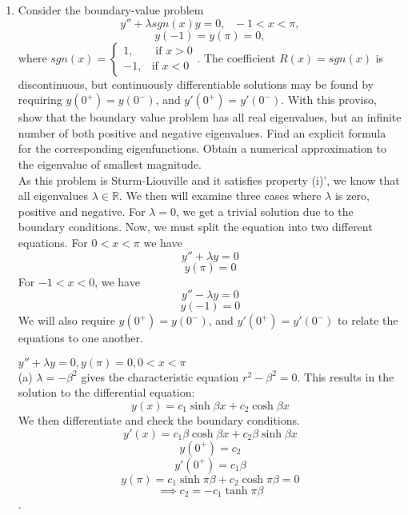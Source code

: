 \documentclass[12pt]{article}
\numberwithin{equation}{section}
\newenvironment{proof}[1][Proof]{\textbf{#1.} }{\ \rule{0.5em}{0.5em}}
\begin{document}
\begin{enumerate}
\begin{enumerate}
\begin{proof}
            $$\lambda\int R(x)|y|^2dx>0\implies \int R(x)|y|^2dx\neq 0.$$
            However, this also implies that
            $$i\lambda_2\int R(x)|y|^2dx=0\iff \lambda_2=0.$$
            We assert that this must be true, as there are no other complex terms in the sum to cancel out with this one.
            \end{proof}
        \item Consider the boundary-value problem
            $$y''+\lambda sgn(x)y=0,\text{  }-1<x<\pi,$$
            $$y(-1)=y(\pi)=0,$$
            where $sgn(x)=\left\{\begin{array}{cc}1,&\text{ if }x>0\\-1,&\text{if }x<0\end{array}\right.$. The coefficient $R(x)=sgn(x)$ is discontinuous, but continuously differentiable solutions may be found by requiring $y(0^+)=y(0^-)$, and $y'(0^+)=y'(0^-)$. With this proviso, show that the boundary value problem has all real eigenvalues, but an infinite number of both positive and negative eigenvalues. Find an explicit formula for the corresponding eigenfunctions. Obtain a numerical approximation to the eigenvalue of smallest magnitude.\\

            As this problem is Sturm-Liouville and it satisfies property (i)', we know that all eigenvalues $\lambda\in\mathbb{R}$. We then will examine three cases where $\lambda$ is zero, positive and negative. For $\lambda =0$, we get a trivial solution due to the boundary conditions. Now, we must split the equation into two different equations. For $0<x<\pi$ we have
            $$y''+\lambda y=0$$
            $$y(\pi)=0$$
            For $-1<x<0$, we have
            $$y''-\lambda y=0$$
            $$y(-1)=0$$
            We will also require $y(0^+)=y(0^-)$, and $y'(0^+)=y'(0^-)$ to relate the equations to one another.
            \pagebreak
            \begin{multicols}{2}
            $y''+\lambda y=0,y(\pi)=0,0<x<\pi$\\
                (a) $\lambda =-\beta^2$ gives the characteristic equation $r^2-\beta^2=0$. This results in the solution to the differential equation:
                $$y(x)=c_1\sinh{\beta x}+c_2\cosh{\beta x}$$
                We then differentiate and check the boundary conditions.
                $$y'(x)=c_1\beta\cosh{\beta x}+c_2\beta\sinh{\beta x}$$
                $$y(0^+)=c_2$$
                $$y'(0^+)=c_1\beta$$
                $$y(\pi)=c_1\sinh{\pi\beta}+c_2\cosh{\pi\beta}=0$$
                $$\implies c_2=-c_1\tanh{\pi\beta}$$
                .
            \columnbreak


\end{multicols}
\end{enumerate}
\end{enumerate}
\end{document}
